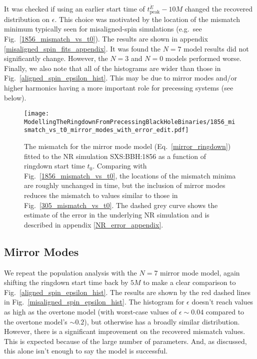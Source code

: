 It was checked if using an earlier start time of $t_{\mathrm{peak}}^{\dot{E}} - 10M$ changed the recovered distribution on $\epsilon$. This choice was motivated by the location of the mismatch minimum typically seen for misaligned-spin simulations (e.g.\ see Fig.~\ref{1856_mismatch_vs_t0}). The results are shown in appendix \ref{misaligned_spin_fits_appendix}. It was found the $N=7$ model results did not significantly change. However, the $N=3$ and $N=0$ models performed worse.
Finally, we also note that all of the histograms are wider than those in Fig.~\ref{aligned_spin_epsilon_hist}. 
This may be due to mirror modes and/or higher harmonics having a more important role for precessing systems (see below). 

\begin{figure}[t]
    \centering
    \texttt{[image: ModellingTheRingdownFromPrecessingBlackHoleBinaries/1856\_mismatch\_vs\_t0\_mirror\_modes\_with\_error\_edit.pdf]}
    \caption[Mismatch as a function of ringdown start time for the mirror-mode model fitted to SXS:BBH:1856]{ 
    The mismatch for the mirror mode model (Eq.~\ref{mirror_ringdown}) fitted to the NR simulation SXS:BBH:1856 as a function of ringdown start time $t_0$. Comparing with Fig.~\ref{1856_mismatch_vs_t0}, the locations of the mismatch minima are roughly unchanged in time, but the inclusion of mirror modes reduces the mismatch to values similar to those in Fig.~\ref{305_mismatch_vs_t0}. The dashed grey curve shows the estimate of the error in the underlying NR simulation and is described in appendix \ref{NR_error_appendix}.
    }
	\label{1856_mirror_mode_mismatch_vs_t0}
\end{figure}


\subsection{Mirror Modes} \label{subsec:misaligned_mirror_modes}

We repeat the population analysis with the $N=7$ mirror mode model, again shifting the ringdown start time back by $5M$ to make a clear comparison to Fig.~\ref{aligned_spin_epsilon_hist}. 
The results are shown by the red dashed lines in Fig.~\ref{misaligned_spin_epsilon_hist}. The histogram for $\epsilon$ doesn't reach values as high as the overtone model (with worst-case values of $\epsilon \sim 0.04$ compared to the overtone model's $\sim 0.2$), but otherwise has a broadly similar distribution.
However, there is a significant improvement on the recovered mismatch values. This is expected because of the large number of parameters. And, as discussed, this alone isn't enough to say the model is successful.

